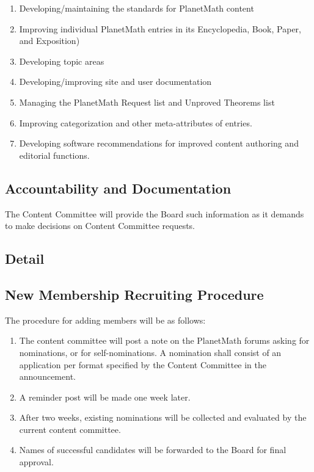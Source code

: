 \begin{enumerate}
\item Developing/maintaining the standards for PlanetMath content
\item Improving individual PlanetMath entries in its Encyclopedia, Book, Paper, and Exposition)
\item Developing topic areas
\item Developing/improving site and user documentation
\item Managing the PlanetMath Request list and Unproved Theorems list
\item Improving categorization and other meta-attributes of entries.
\item Developing software recommendations for improved content authoring and editorial functions.
\end{enumerate}


\subsection*{Accountability and Documentation}
The Content Committee will provide the Board such information as it
demands to make decisions on Content Committee requests.


\subsection*{Detail}

\subsection*{New Membership Recruiting Procedure}

The procedure for adding members will be as follows:

\begin{enumerate}
\item The content committee will post a note on the PlanetMath forums asking for nominations, or for self-nominations. A nomination shall consist of an application per format specified by the Content Committee in the announcement.
\item A reminder post will be made one week later.
\item After two weeks, existing nominations will be collected and evaluated by the current content committee.
\item Names of successful candidates will be forwarded to the Board for final approval.
\end{enumerate}

